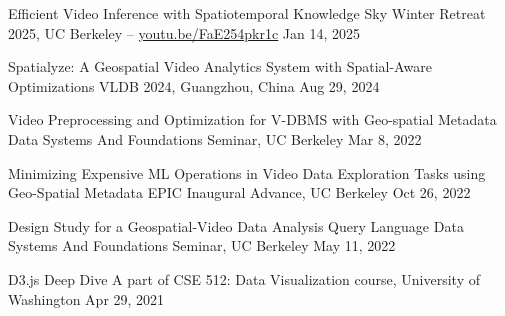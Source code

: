 

\begin{cvpubs}

  \cvpub
    {Efficient Video Inference with Spatiotemporal Knowledge} %
    {Sky Winter Retreat 2025, UC Berkeley -- \href{https://youtu.be/FaE254pkr1c}{\underline{youtu.be/FaE254pkr1c}}} %
    {Jan 14, 2025} %
    {} %

  \cvpub
    {Spatialyze: A Geospatial Video Analytics System with Spatial-Aware Optimizations} %
    {VLDB 2024, Guangzhou, China} %
    {Aug 29, 2024} %
    {} %


  \cvpub
    {Video Preprocessing and Optimization for V-DBMS with Geo-spatial Metadata} %
    {Data Systems And Foundations Seminar, UC Berkeley} %
    {Mar 8, 2022} %
    {} %

  \cvpub
    {Minimizing Expensive ML Operations in Video Data Exploration Tasks using Geo-Spatial Metadata} %
    {EPIC Inaugural Advance, UC Berkeley} %
    {Oct 26, 2022} %
    {} %

  \cvpub
    {Design Study for a Geospatial-Video Data Analysis Query Language} %
    {Data Systems And Foundations Seminar, UC Berkeley} %
    {May 11, 2022} %
    {} %

  \cvpub
    {D3.js Deep Dive} %
    {A part of CSE 512: Data Visualization course, University of Washington} %
    {Apr 29, 2021} %
    {} %
    

\end{cvpubs}

